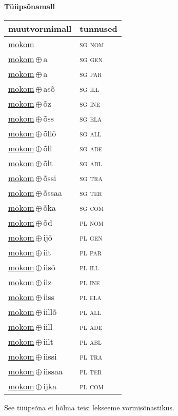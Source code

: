 

\vspace{3.5em}
\noindent \begin{minipage}{\textwidth}
\noindent \textbf{Tüüpsõnamall \,}\\

\begin{sideways}
\begin{tabular}{l l}
muutvormimall & tunnused \\
\hline
\underline{mokom} & \textsc{ sg nom } \\
\underline{mokom}\,$\oplus$\,a & \textsc{ sg gen } \\
\underline{mokom}\,$\oplus$\,a & \textsc{ sg par } \\
\underline{mokom}\,$\oplus$\,asõ & \textsc{ sg ill } \\
\underline{mokom}\,$\oplus$\,õz & \textsc{ sg ine } \\
\underline{mokom}\,$\oplus$\,õss & \textsc{ sg ela } \\
\underline{mokom}\,$\oplus$\,õllõ & \textsc{ sg all } \\
\underline{mokom}\,$\oplus$\,õll & \textsc{ sg ade } \\
\underline{mokom}\,$\oplus$\,õlt & \textsc{ sg abl } \\
\underline{mokom}\,$\oplus$\,õssi & \textsc{ sg tra } \\
\underline{mokom}\,$\oplus$\,õssaa & \textsc{ sg ter } \\
\underline{mokom}\,$\oplus$\,õka & \textsc{ sg com } \\
\underline{mokom}\,$\oplus$\,õd & \textsc{ pl nom } \\
\underline{mokom}\,$\oplus$\,ijõ & \textsc{ pl gen } \\
\underline{mokom}\,$\oplus$\,iit & \textsc{ pl par } \\
\underline{mokom}\,$\oplus$\,iisõ & \textsc{ pl ill } \\
\underline{mokom}\,$\oplus$\,iiz & \textsc{ pl ine } \\
\underline{mokom}\,$\oplus$\,iiss & \textsc{ pl ela } \\
\underline{mokom}\,$\oplus$\,iillõ & \textsc{ pl all } \\
\underline{mokom}\,$\oplus$\,iill & \textsc{ pl ade } \\
\underline{mokom}\,$\oplus$\,iilt & \textsc{ pl abl } \\
\underline{mokom}\,$\oplus$\,iissi & \textsc{ pl tra } \\
\underline{mokom}\,$\oplus$\,iissaa & \textsc{ pl ter } \\
\underline{mokom}\,$\oplus$\,ijka & \textsc{ pl com } \\
\end{tabular}
\end{sideways}
\label{tab:tüüpsõnamall-mokom}

\end{minipage}

 
\vspace{1em}
\noindent See tüüpsõna ei hõlma teisi lekseeme vormi\-sõnastikus.
